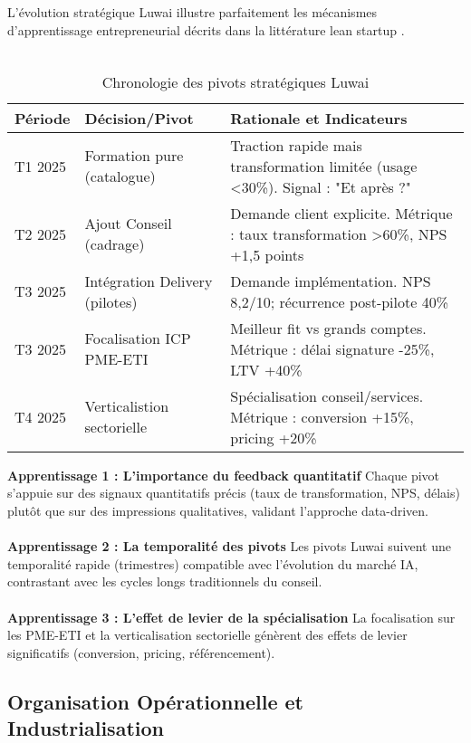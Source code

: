 L'évolution stratégique Luwai illustre parfaitement les mécanismes d'apprentissage entrepreneurial décrits dans la littérature lean startup \cite{ries2011lean}.
\\\\
\begin{table}[ht]
\centering
\caption{Chronologie des pivots stratégiques Luwai}
\label{tab:luwai_pivots}
\begin{tabular}{@{}p{3cm}p{6cm}p{6cm}@{}}
\toprule
\textbf{Période} & \textbf{Décision/Pivot} & \textbf{Rationale et Indicateurs} \\
\midrule
T1 2025 & Formation pure (catalogue) & Traction rapide mais transformation limitée (usage <30\%). Signal : "Et après ?" \\
T2 2025 & Ajout Conseil (cadrage) & Demande client explicite. Métrique : taux transformation >60\%, NPS +1,5 points \\
T3 2025 & Intégration Delivery (pilotes) & Demande implémentation. NPS 8,2/10; récurrence post-pilote 40\% \\
T3 2025 & Focalisation ICP PME-ETI & Meilleur fit vs grands comptes. Métrique : délai signature -25\%, LTV +40\% \\
T4 2025 & Verticalistion sectorielle & Spécialisation conseil/services. Métrique : conversion +15\%, pricing +20\% \\
\bottomrule
\end{tabular}
\end{table}
\medskip
\textbf{Apprentissage 1 : L'importance du feedback quantitatif}
Chaque pivot s'appuie sur des signaux quantitatifs précis (taux de transformation, NPS, délais) plutôt que sur des impressions qualitatives, validant l'approche data-driven.
\\\\
\textbf{Apprentissage 2 : La temporalité des pivots}
Les pivots Luwai suivent une temporalité rapide (trimestres) compatible avec l'évolution du marché IA, contrastant avec les cycles longs traditionnels du conseil.
\\\\
\textbf{Apprentissage 3 : L'effet de levier de la spécialisation}
La focalisation sur les PME-ETI et la verticalisation sectorielle génèrent des effets de levier significatifs (conversion, pricing, référencement).

\subsection{Organisation Opérationnelle et Industrialisation}

